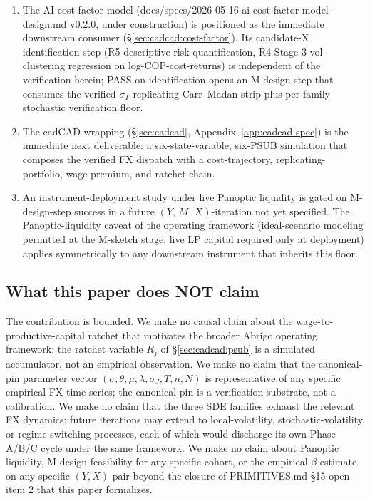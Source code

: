 \documentclass[11pt,letterpaper]{article}
\newcommand{\sigmaT}{\sigma_{T}}
\newcommand{\Ymx}{(Y,\,M,\,X)}
\begin{document}
\begin{enumerate}
    \item The AI-cost-factor model
        (\textsf{docs/specs/2026-05-16-ai-cost-factor-model-design.md}
        v0.2.0, under construction) is positioned as the immediate
        downstream consumer (\S\ref{sec:cadcad:cost-factor}). Its
        candidate-X identification step (R5 descriptive risk
        quantification, R4-Stage-3 vol-clustering regression on
        log-COP-cost-returns) is independent of the verification
        herein; PASS on identification opens an M-design step that
        consumes the verified $\sigmaT$-replicating Carr--Madan strip
        plus per-family stochastic verification floor.
    \item The cadCAD wrapping (\S\ref{sec:cadcad},
        Appendix~\ref{app:cadcad-spec}) is the immediate next
        deliverable: a six-state-variable, six-PSUB simulation that
        composes the verified FX dispatch with a cost-trajectory,
        replicating-portfolio, wage-premium, and ratchet chain.
    \item An instrument-deployment study under live Panoptic
        liquidity is gated on M-design-step success in a future
        \(\Ymx\)-iteration not yet specified. The Panoptic-liquidity
        caveat of the operating framework (ideal-scenario modeling
        permitted at the M-sketch stage; live LP capital required
        only at deployment) applies symmetrically to any downstream
        instrument that inherits this floor.
\end{enumerate}

\subsection{What this paper does NOT claim}
\label{sec:discussion:disclaim}

The contribution is bounded. We make no causal claim about the
wage-to-productive-capital ratchet that motivates the broader
Abrigo operating framework; the ratchet variable $R_{j}$ of
\S\ref{sec:cadcad:psub} is a simulated accumulator, not an empirical
observation. We make no claim that the canonical-pin parameter vector
$(\sigma, \theta, \bar\mu, \lambda, \sigma_{J}, T, n, N)$ is
representative of any specific empirical FX time series; the
canonical pin is a verification substrate, not a calibration.
We make no claim that the three SDE families exhaust the relevant
FX dynamics; future iterations may extend to local-volatility,
stochastic-volatility, or regime-switching processes, each of which
would discharge its own Phase A/B/C cycle under the same framework.
We make no claim about Panoptic liquidity, M-design feasibility for
any specific cohort, or the empirical $\beta$-estimate on any specific
$(Y, X)$ pair beyond the closure of PRIMITIVES.md \S15 open item 2
that this paper formalizes.
\end{document}
